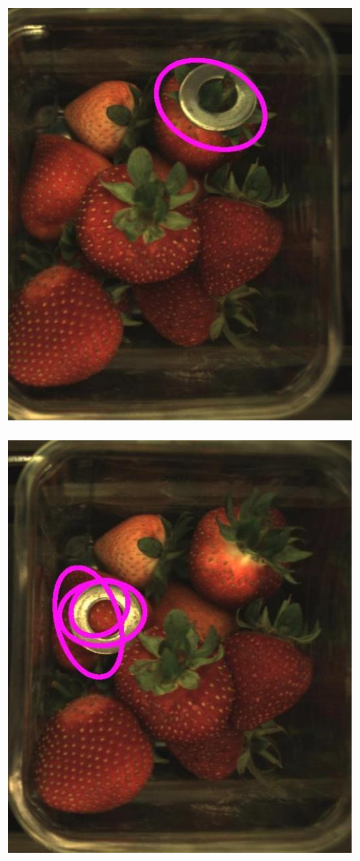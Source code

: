 \documentclass[fleqn,twoside,12pt]{report}
\begin{document}
\begin{figure}[h]
	\centering
	\begin{subfigure}{.25\textwidth}
		\centering
		\includegraphics[width=.9\linewidth]{fo_washer_1.jpg}
		\caption{}
		\label{fig:fo_washer_1}
	\end{subfigure}%
	\begin{subfigure}{.25\textwidth}
		\centering
		\includegraphics[width=.9\linewidth]{fo_washer_2.jpg}

\end{subfigure}
\end{figure}
\end{document}
